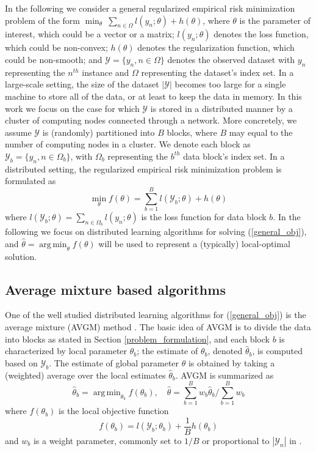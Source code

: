 \documentclass{article}
\DeclareMathOperator*{\argmin}{arg\,min}
\newcommand{\1}[0]{\ensuremath{\boldsymbol{1}}\xspace}
\begin{document}
In the following we consider a general regularized empirical risk minimization problem of the form $\min_\theta ~ \sum_{n\in\Omega}l(y_n; \theta)+ h(\theta)$, where $\theta$ is the parameter of interest, which could be a vector or a matrix; $l(y_n; \theta)$ denotes the loss function, which could be non-convex; $h(\theta)$ denotes the regularization function, which could be non-smooth; and $\mathcal{Y} = \{y_n, n\in\Omega\}$ denotes the observed dataset with $y_n$ representing the $n^{th}$ instance and $\Omega$ representing the dataset's index set. In a large-scale setting, the size of the dataset $|\mathcal{Y}|$ becomes too large for a single machine to store all of the data, or at least to keep the data in memory. In this work we focus on the case for which $\mathcal{Y}$ is stored in a distributed manner by a cluster of computing nodes connected through a network. More concretely, we assume $\mathcal{Y}$ is (randomly) partitioned into $B$ blocks, where $B$ may equal to the number of computing nodes in a cluster. We denote each block as $\mathcal{Y}_b = \{y_n, n \in \Omega_b\}$, with $\Omega_b$ representing the $b^{th}$ data block's index set. In a distributed setting, the regularized empirical risk minimization problem is formulated as
\begin{equation}\label{general_obj}
\textstyle\min_{\theta} f(\theta) = \sum_{b=1}^Bl(\mathcal{Y}_b; \theta)+h(\theta)
\end{equation}
where $l(\mathcal{Y}_b; \theta) = \sum_{n\in\Omega_b}l(y_n; \theta)$ is the loss function for data block $b$. In the following we focus on distributed learning algorithms for solving (\ref{general_obj}), and $\hat\theta = \argmin_\theta f(\theta)$ will be used to represent a (typically) local-optimal solution.

\subsection{Average mixture based algorithms}\label{AVGM}

One of the well studied distributed learning algorithms for (\ref{general_obj}) is the average mixture (AVGM) method \cite{Mann2009, Zinkevich2010, YZhang2012}. The basic idea of AVGM is to divide the data into blocks as stated in Section \ref{problem_formulation}, and each block $b$ is characterized by local parameter $\theta_b$; the estimate of $\theta_b$, denoted $\hat\theta_b$, is computed based on $\mathcal{Y}_b$. The estimate of global parameter $\theta$ is obtained by taking a (weighted) average over the local estimates $\hat\theta_b$. AVGM is summarized as
\begin{equation}\label{avgm}
\hat\theta_b = \textstyle\argmin_{\theta_b}f(\theta_b), \quad \hat\theta = \textstyle\sum_{b=1}^B w_b\hat\theta_b/\sum_{b=1}^Bw_b
\end{equation} 
where $f(\theta_b)$ is the local objective function
\begin{equation}\label{avgm_local}
\textstyle f(\theta_b) = l(\mathcal{Y}_b; \theta_b)+\frac{1}{B}h(\theta_b)
\end{equation}
and $w_b$ is a weight parameter, commonly set to $1/B$ \cite{Mann2009, Zinkevich2010} or proportional to $|\mathcal{Y}_n|$ in \cite{YZhang2012}. 
\end{document}

